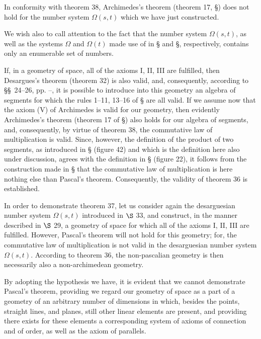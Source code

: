 \documentclass[11pt,oneside]{book}
\begin{document}
In conformity with theorem 38, Archimedes's theorem
(theorem 17, \S{}) does not hold for the number
system $\Omega (s, t)$ which we have just constructed.

We wish also to call attention to the fact that the
number system $\Omega (s, t)$, as well as the systems $\Omega$ and
$\Omega (t)$ made use of in \S{} and \S{}, respectively, contains
only an enumerable set of numbers.

\label{p34}

If, in a geometry of space, all of the axioms I, II,
III are fulfilled, then Desargues's theorem (theorem
32) is also valid, and, consequently, according to
\S\S~24--26, pp. \pageref{folio79}--\pageref{folio89}, it is possible to introduce into this
geometry an algebra of segments for which the rules
1--11, 13--16 of \S{} are all valid. If we assume now
that the axiom (V) of Archimedes is valid for our
geometry, then evidently Archimedes's theorem (theorem
17 of \S{}) also holds for our algebra of segments,
and, consequently, by virtue of theorem 38,
the commutative law of multiplication is valid. Since,
however, the definition of the product of two segments,
as introduced in \S{} (figure 42) and which is
the definition here also under discussion, agrees with
the definition in \S{} (figure 22), it follows from the
construction made in \S{} that the commutative law
of multiplication is here nothing else than Pascal's
theorem. Consequently, the validity of theorem 36 is
established.

In order to demonstrate theorem 37, let us consider
again the desarguesian number system $\Omega(s, t)$
introduced in $\S$ 33, and construct, in the manner described
in $\S$ 29, a geometry of space for which all of
the axioms I, II, III are fulfilled. However, Pascal's
theorem will not hold for this geometry; for, the commutative
law of multiplication is not valid in the desarguesian
number system $\Omega(s, t)$. According to theorem 36,
the non-pascalian geometry is then necessarily
also a non-archimedean geometry.

By adopting the hypothesis we have, it is evident
that we cannot demonstrate Pascal's theorem, providing
we regard our geometry of space as a part of
a geometry of an arbitrary number of dimensions in
which, besides the points, straight lines, and planes,
still other linear elements are present, and providing
there exists for these elements a corresponding system
of axioms of connection and of order, as well as
the axiom of parallels.
\end{document}
